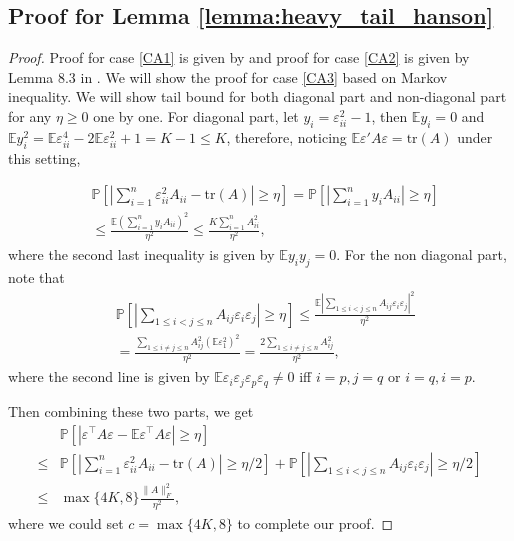 \subsection{Proof for Lemma \ref{lemma:heavy_tail_hanson}}
\begin{proof}
Proof for case \eqref{CA1} is given by \cite{rudelson2013hanson} and proof for case \eqref{CA2} is given by Lemma 8.3 in \cite{erdHos2012bulk}. We will show the proof for case \eqref{CA3} based on Markov inequality. We will show tail bound for both 
diagonal part and non-diagonal part for any $\eta \ge 0$ one by one. For diagonal part,  let $y_i = \varepsilon^2_{ii}-1$, then 
$\mathbb{E}y_i = 0$ and $\mathbb{E}y^2_i = \mathbb{E}\varepsilon^4_{ii} - 2\mathbb{E}\varepsilon^2_{ii}+1 =  K-1\le K$, therefore, noticing $\mathbb{E}\varepsilon'A\varepsilon = \text{tr}(A)$ under this setting, 

\begin{equation}
\begin{aligned}
&\mathbb{P}\left[\left|\sum_{i=1}^n \varepsilon^2_{ii} A_{ii} - \text{tr}(A)\right|\ge \eta\right] = \mathbb{P}\left[\left|\sum_{i=1}^n y_iA_{ii}\right|\ge \eta\right]\\
&\le \frac{\mathbb{E}(\sum_{i=1}^n y_iA_{ii})^2}{\eta^2} \le \frac{K\sum_{i=1}^n A^2_{ii}}{\eta^2}, 
\end{aligned}
\end{equation}
where the second last inequality is given by $\mathbb{E} y_iy_j = 0$. 
For the non diagonal part, note that
\begin{equation}
\begin{aligned}
&\mathbb{P}\left[\left|\sum_{1\le i<j\le n} A_{ij}\varepsilon_i\varepsilon_j \right|\ge \eta\right] \le \frac{\mathbb{E}\left|\sum_{1\le i< j\le n} A_{ij}\varepsilon_i\varepsilon_j \right|^2}{\eta^2} \\
& = \frac{\sum_{1\le i \neq j\le n} A^2_{ij}(\mathbb{E}\varepsilon^2_1)^2}{\eta^2} =  \frac{2\sum_{1\le i\neq j\le n} A^2_{ij}}{\eta^2},
\end{aligned}
\end{equation}
where the second line is given by $\mathbb{E}\varepsilon_i\varepsilon_j\varepsilon_p\varepsilon_q\neq 0$ iff $i=p,j=q$ or $i=q, i=p$. \par 
Then combining these two parts, we get
\begin{equation}
\begin{aligned}
    &\mathbb{P}\left[|\varepsilon^\top A\varepsilon - \mathbb{E} \varepsilon^\top A\varepsilon|\ge \eta\right] \\
    \leq& \mathbb{P}\left[\left|\sum_{i=1}^n \varepsilon ^2_{ii} A_{ii} - \text{tr}(A)\right|\ge \eta/2\right]+\mathbb{P}\left[\left|\sum_{1\le i<j\le n} A_{ij}\varepsilon_i\varepsilon_j \right|\ge \eta/2\right]\\
    \leq& \max\{4K,8\} \frac{\|A\|_F^2}{\eta^2},
\end{aligned}
\end{equation}
where we could set $c=\max\{4K,8\}$ to complete our proof. 
\end{proof}